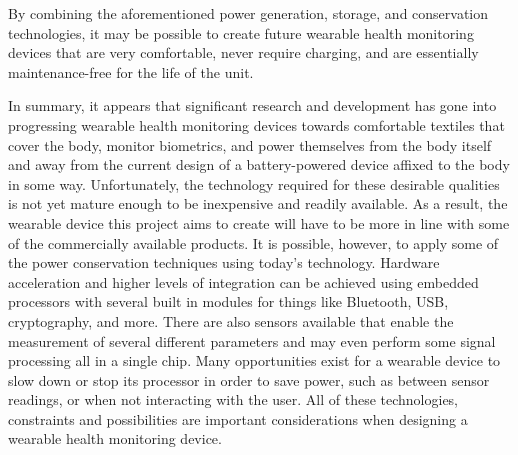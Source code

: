 By combining the aforementioned power generation, storage, and conservation technologies,
it may be possible to create future wearable health monitoring 
devices that are very comfortable, never 
require charging, and are essentially maintenance-free for the life of the unit.

In summary, it appears that significant research and development has gone into
progressing wearable health monitoring devices towards comfortable
textiles that cover the body, monitor biometrics, and power themselves from the
body itself and away from the current design of a
battery-powered device affixed to the body in some way.  
Unfortunately, the technology required for these desirable qualities is 
not yet mature enough to be inexpensive and readily available.  As a result,
the wearable device this project aims to create will have to be more in line 
with some of the commercially available products. It is
possible, however, to apply some of the power conservation techniques using 
today’s technology. Hardware acceleration and higher levels of 
integration can be achieved using embedded processors with several built in
modules for things like Bluetooth, USB, cryptography, and more. There are also
sensors available that enable the measurement of several different parameters 
and may even perform some signal processing all in a single chip. Many 
opportunities exist for a wearable device to slow down or stop its processor in
order to save power, such as between sensor readings, or when not interacting
with the user. All of these technologies, constraints and possibilities are 
important considerations when designing a wearable health monitoring device.
